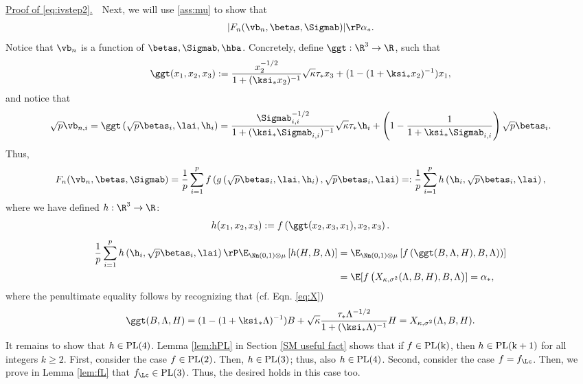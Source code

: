\vspace{2pt}
\noindent\underline{Proof of \eqref{eq:ivstep2}.}~~Next, we will use \ref{ass:mu} to show that 
\begin{align}
|F_n(\vb_n,\betas,\Sigmab)| \rP \alpha_*.\label{eq:AO_conv}
\end{align}
Notice that $\vb_n$ is a function of $\betas,\Sigmab,\hba$. Concretely, define ${\ggt}:\R^3\rightarrow\R$, such that
$$
\ggt(x_1,x_2,x_3) := \frac{x_2^{-1/2}}{1+(\ksi_* x_2)^{-1}}\sqrt{\kappa}\tau_* x_3 + (1-(1+\ksi_*x_2)^{-1})x_1,
$$
and notice that
$$
\sqrt{p}\vb_{n,i} = \ggt\left(\sqrt{p}\betas_i,\lai,\h_i\right) = \frac{{\Sigmab_{i,i}^{-1/2}}}{1+(\ksi_*\Sigmab_{i,i})^{-1}}\sqrt{\kappa}\tau_*\h_i +\left(1-\frac{1}{1+\ksi_*\Sigmab_{i,i}}\right)\sqrt{p}\betas_i.
$$
Thus,
$$
F_n(\vb_n,\betas,\Sigmab) = \frac{1}{p}\sum_{i=1}^p f\left(g\left(\sqrt{p}\betas_i,\lai,\h_i\right),\sqrt{p}\betas_i,\lai\right) =: \frac{1}{p}\sum_{i=1}^p h\left(\h_i,\sqrt{p}\betas_i,\lai\right),
$$
where we have defined $h:\R^3\rightarrow\R$:
\begin{align}
h(x_1,x_2,x_3) := f\left(\ggt(x_2,x_3,x_1),x_2,x_3\right).\label{h func}
\end{align}
\begin{align}
\frac{1}{p}\sum_{i=1}^p h\left(\h_i,\sqrt{p}\betas_i,\lai\right) \rP \E_{\Nn(0,1)\otimes \mu}\left[h(H,B,\Lambda)\right] &=  \E_{\Nn(0,1)\otimes \mu}\left[f\left(\ggt(B,\Lambda,H),B,\Lambda\right))\right]\\
& = \E[f\left(X_{\kappa,\sigma^2}(\Lambda,B,H),B,\Lambda\right)] = \alpha_*,
\end{align}
where the penultimate equality follows by recognizing that (cf. Eqn. \eqref{eq:X})
$$
\ggt(B,\Lambda,H) = (1-(1+\ksi_*\Lambda)^{-1})B + \sqrt{\kappa}\frac{\tau_*\Lambda^{-1/2}}{1+(\ksi_*\Lambda)^{-1}}H =  X_{\kappa,\sigma^2}(\Lambda,B,H).
$$
It remains to show that $h\in\rm{PL}(4)$. Lemma \ref{lem:hPL} in Section \ref{SM useful fact} shows that if $f\in\rm{PL}(k)$, then $h\in\rm{PL}(k+1)$ for all integers $k\geq 2$.  First, consider the case $f\in\rm{PL}(2)$. Then,  $h\in\rm{PL}(3)$; thus, also $h\in\rm{PL}(4)$. Second, consider the case $f=f_\Lc$. Then, we prove in Lemma \ref{lem:fL}  that $f_\Lc\in\rm{PL}(3)$. Thus, the desired holds in this case too.  

\vspace{5pt}
